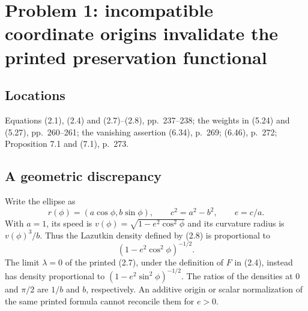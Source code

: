 \documentclass[10pt]{article}
\begin{document}
\section*{Problem 1: incompatible coordinate origins invalidate the printed preservation functional}
\subsection*{Locations}
Equations (2.1), (2.4) and (2.7)–(2.8), pp. 237–238; the weights in (5.24) and (5.27), pp. 260–261; the vanishing assertion (6.34), p. 269; (6.46), p. 272; Proposition 7.1 and (7.1), p. 273.\par
\subsection*{A geometric discrepancy}
Write the ellipse as \[r(\phi)=(a\cos\phi,b\sin\phi),\qquad
 c^2=a^2-b^2,\qquad e=c/a.\] With \(a=1\), its speed is \(v(\phi)=\sqrt{1-e^2\cos^2\phi}\) and its curvature radius is \(v(\phi)^3/b\). Thus the Lazutkin density defined by (2.8) is proportional to \[(1-e^2\cos^2\phi)^{-1/2}.\] The limit \(\lambda=0\) of the printed (2.7), under the definition of \(F\) in (2.4), instead has density proportional to \((1-e^2\sin^2\phi)^{-1/2}\). The ratios of the densities at \(0\) and \(\pi/2\) are \(1/b\) and \(b\), respectively. An additive origin or scalar normalization of the same printed formula cannot reconcile them for \(e>0\).\par
\end{document}
